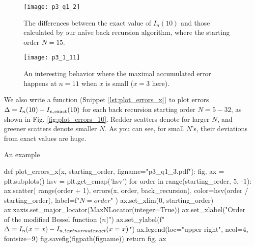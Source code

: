 \begin{figure}[H] %
    \centering
    \begin{minipage}[t]{0.45\linewidth}
        \centering
        \texttt{[image: p3\_q1\_2]}
        \caption{The differences between the exact value of $I_n(10)$ and those calculated by
            our naïve back recursion algorithm, where the starting order $N = 15$.}
        \label{fig:I_n_10}
    \end{minipage}
    \hfil
    \begin{minipage}[t]{0.45\linewidth}
        \centering
        \texttt{[image: p3\_1\_11]}
        \caption{An interesting behavior where the maximal accumulated error happens at
            $n = 11$ when $x$ is small ($x = 3$ here).}
        \label{fig:I_n_3}
    \end{minipage}
\end{figure}

We also write a function  (Snippet \ref{lst:plot_errors_x}) to
plot errors $\Delta = I_n(10) - I_{n,\textnormal{exact}}(10)$ for each
back recursion starting order $N = 5 - 32$, as shown in Fig. \ref{fig:plot_errors_10}.
Redder scatters denote for larger $N$, and greener scatters denote
smaller $N$. As you can see, for small $N$'s, their deviations from exact values are huge.

\begin{algorithm}
    \caption{An example}
    \label{lst:plot_errors_x}
    \begin{pythoncode}
        def plot_errors_x(x, starting_order, figname="p3_q1_3.pdf"):
            fig, ax = plt.subplots()
            hsv = plt.get_cmap('hsv')
            for order in range(starting_order, 5, -1):
                ax.scatter(
                    range(order + 1), errors(x, order, back_recursion),
                    color=hsv(order / starting_order),
                    label=f"$N={order}$"
                )
            ax.set_xlim(0, starting_order)
            ax.xaxis.set_major_locator(MaxNLocator(integer=True))
            ax.set_xlabel("Order of the modified Bessel function ($n$)")
            ax.set_ylabel(f"$\Delta = I_{{n}}(x={x}) - I_{{n,\\textnormal{{exact}}}}(x={x})$")
            ax.legend(loc="upper right", ncol=4, fontsize=9)
            fig.savefig(figpath(figname))
            return fig, ax
        \end{pythoncode}
\end{algorithm}

